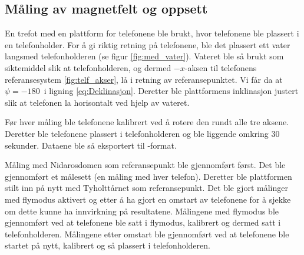 \subsection{Måling av magnetfelt og oppsett}
En trefot med en plattform for telefonene ble brukt, hvor telefonene ble plassert i en telefonholder. For å gi riktig retning på telefonene, ble det plassert ett vater langsmed telefonholderen (se figur \ref{fig:med_vater}). Vateret ble så brukt som siktemiddel slik at telefonholderen, og dermed $-x$-aksen til telefonens referansesystem \ref{fig:telf_akser}, lå i retning av referansepunktet. Vi får da at $\psi = -180$\textdegree\ i ligning \eqref{eq:Deklinasjon}. Deretter ble plattformens inklinasjon justert slik at telefonen la horisontalt ved hjelp av vateret.

Før hver måling ble telefonene kalibrert ved å rotere den rundt alle tre aksene. Deretter ble telefonene plassert i telefonholderen og ble liggende omkring $30$ sekunder. Dataene ble så eksportert til -format. 

Måling med Nidarosdomen som referansepunkt ble gjennomført først. Det ble gjennomført et målesett (en måling med hver telefon). Deretter ble plattformen stilt inn på nytt med Tyholttårnet som referansepunkt. Det ble gjort målinger med flymodus aktivert og etter å ha gjort en omstart av telefonene for å sjekke om dette kunne ha innvirkning på resultatene. Målingene med flymodus ble gjennomført ved at telefonene ble satt i flymodus, kalibrert og dermed satt i telefonholderen. Målingene etter omstart ble gjennomført ved at telefonene ble startet på nytt, kalibrert og så plassert i telefonholderen.



